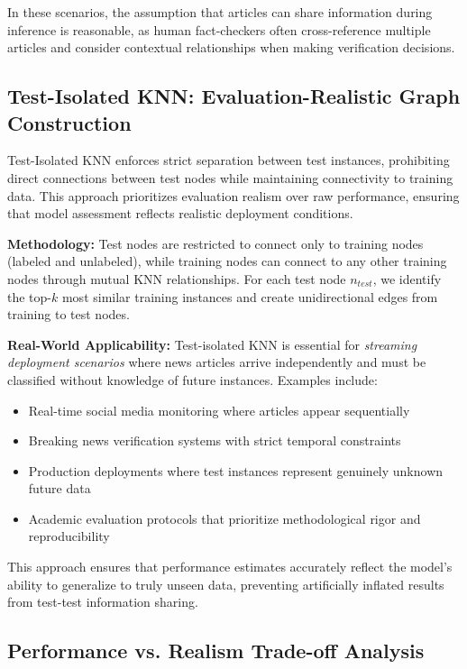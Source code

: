 In these scenarios, the assumption that articles can share information during inference is reasonable, as human fact-checkers often cross-reference multiple articles and consider contextual relationships when making verification decisions.

\subsection{Test-Isolated KNN: Evaluation-Realistic Graph Construction}

Test-Isolated KNN enforces strict separation between test instances, prohibiting direct connections between test nodes while maintaining connectivity to training data. This approach prioritizes evaluation realism over raw performance, ensuring that model assessment reflects realistic deployment conditions.

\textbf{Methodology:} Test nodes are restricted to connect only to training nodes (labeled and unlabeled), while training nodes can connect to any other training nodes through mutual KNN relationships. For each test node $n_{test}$, we identify the top-$k$ most similar training instances and create unidirectional edges from training to test nodes.

\textbf{Real-World Applicability:} Test-isolated KNN is essential for \emph{streaming deployment scenarios} where news articles arrive independently and must be classified without knowledge of future instances. Examples include:
\begin{itemize}
    \item Real-time social media monitoring where articles appear sequentially
    \item Breaking news verification systems with strict temporal constraints
    \item Production deployments where test instances represent genuinely unknown future data
    \item Academic evaluation protocols that prioritize methodological rigor and reproducibility
\end{itemize}

This approach ensures that performance estimates accurately reflect the model's ability to generalize to truly unseen data, preventing artificially inflated results from test-test information sharing.

\subsection{Performance vs. Realism Trade-off Analysis}

